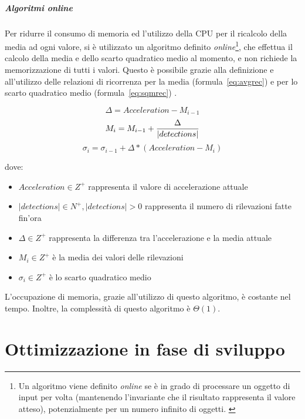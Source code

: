 \documentclass[a4paper,10pt]{memoir}
\begin{document}
\paragraph{Algoritmi \textit{online}} Per ridurre il consumo di memoria ed l'utilizzo della CPU per il ricalcolo della media ad ogni valore, si è utilizzato un algoritmo definito \textit{online}\footnote{Un algoritmo viene definito \textit{online} se è in grado di processare un oggetto di input per volta (mantenendo l'invariante che il risultato rappresenta il valore atteso), potenzialmente per un numero infinito di oggetti. \cite{onlinealg}}, che effettua il calcolo della media e dello scarto quadratico medio al momento, e non richiede la memorizzazione di tutti i valori. Questo è possibile grazie alla definizione e all'utilizzo delle relazioni di ricorrenza per la media (formula~\ref{eq:avgrec}) e per lo scarto quadratico medio (formula~\ref{eq:sqmrec}) \cite{onlineavg}.

\begin{equation}
\Delta = Acceleration - M_{i-1}
\end{equation}
\begin{equation}
\label{eq:avgrec}
M_i = M_{i-1} + {\Delta \over |detections|}
\end{equation}
\begin{equation}
\label{eq:sqmrec}
\sigma_i = \sigma_{i-1} + \Delta * (Acceleration - M_i)
\end{equation}

dove: \begin{itemize}
\item $Acceleration \in Z^+$ rappresenta il valore di accelerazione attuale
\item $|detections| \in N^+, |detections| > 0$ rappresenta il numero di rilevazioni fatte fin'ora
\item $\Delta \in Z^+$ rappresenta la differenza tra l'accelerazione e la media attuale
\item $M_i \in Z^+$ è la media dei valori delle rilevazioni
\item $\sigma_i \in Z^+$ è lo scarto quadratico medio
\end{itemize}

L'occupazione di memoria, grazie all'utilizzo di questo algoritmo, è costante nel tempo. Inoltre, la complessità di questo algoritmo è $\Theta(1)$.

\chapter{Ottimizzazione in fase di sviluppo}
\end{document}
